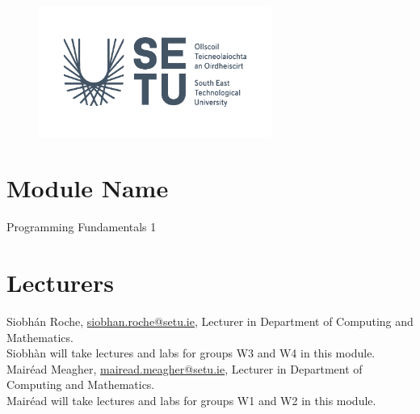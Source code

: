 \documentclass{article}
\begin{document}
\vspace{-.5cm}
    \begin{figure}[h]
    
        \centering
        \includegraphics[width=3in]{img/RGB.png}
    \end{figure}
\thispagestyle{empty} 
\pagebreak
\tableofcontents
\thispagestyle{empty} 
\pagebreak
{}
\section{Module Name}   
Programming  Fundamentals 1 \\
\section{Lecturers}
Siobh\'an Roche, \href{mailto:siobhan.roche@setu.ie}{siobhan.roche@setu.ie}, 
Lecturer in Department of Computing and Mathematics.\\
Siobh\`an will take lectures and labs for groups W3 and W4 in this module.\\
Mair\'ead Meagher, \href{mailto:mairead.meagher@setu.ie}{mairead.meagher@setu.ie}, 
Lecturer in Department of Computing and Mathematics.\\
Mair\'ead will take lectures and labs for groups W1 and W2 in this module.\\
\end{document}
